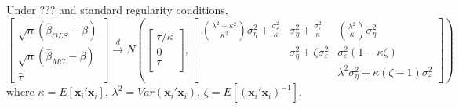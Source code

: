 \begin{thm}
\label{thm:OLSvsMG}
  Under ??? and standard regularity conditions, 
\[
  \left[\begin{array}{c}
\sqrt{n} (\widehat{\beta}_{OLS} - \beta)\\
\sqrt{n} (\widehat{\beta}_{MG} - \beta)\\
\widehat{\tau}
\end{array}\right] \overset{d}{\rightarrow} N \left( 
\left[\begin{array}{c}
\tau/\kappa \\
0  \\
\tau\\
\end{array}\right],  
\left[
\begin{array}{ccc}
  \displaystyle\left(\frac{\lambda^2 + \kappa^2}{\kappa^2}\right)\sigma_\eta^2 + \frac{\sigma_\varepsilon^2}{\kappa} & \displaystyle \sigma_\eta^2 + \frac{\sigma_\varepsilon^2}{\kappa} &\displaystyle\left(\frac{\lambda^2}{\kappa}\right)\sigma_\eta^2  \\
  & \sigma_{\eta}^2 + \zeta \sigma_\varepsilon^2 & \sigma_{\varepsilon}^2 (1 - \kappa\zeta) \\
   &  & \lambda^2 \sigma_\eta^2 + \kappa(\zeta - 1) \sigma_\varepsilon^2 
\end{array}
\right]\right)
\]
where $\kappa = E[\mathbf{x}_i' \mathbf{x}_i]$, $\lambda^2 = Var\left( \mathbf{x}_i'\mathbf{x}_i \right)$, $\zeta = E\left[ \left( \mathbf{x}_i' \mathbf{x}_i \right)^{-1} \right]$.  
\end{thm}


